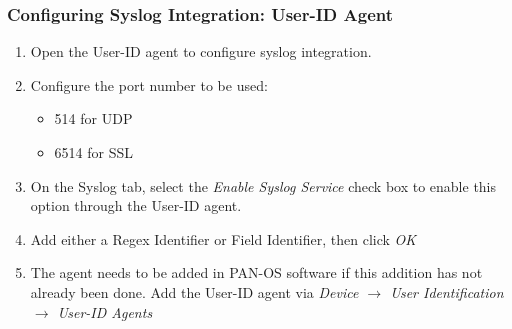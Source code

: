 \subsubsection{Configuring Syslog Integration: User-ID Agent}
\begin{enumerate}
    \item Open the User-ID agent to configure syslog integration.
    \item Configure the port number to be used:
        \begin{itemize}
            \item 514 for UDP
            \item 6514 for SSL
        \end{itemize}
    \item On the Syslog tab, select the \textit{Enable Syslog Service} check box to enable this option through the User-ID agent.
    \item Add either a Regex Identifier or Field Identifier, then click \textit{OK}
    \item The agent needs to be added in PAN-OS software if this addition has not already been done.
    Add the User-ID agent via \textit{Device $\rightarrow$ User Identification $\rightarrow$ User-ID Agents}
\end{enumerate}